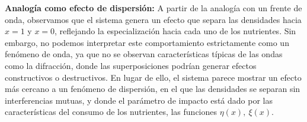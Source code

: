 \textbf{Analogía como efecto de dispersión:}
A partir de la analogía con un frente de onda, observamos que el sistema genera un efecto que separa las densidades hacia $x=1$ y $x=0$, reflejando la especialización hacia cada uno de los nutrientes. Sin embargo, no podemos interpretar este comportamiento estrictamente como un fenómeno de onda, ya que no se observan características típicas de las ondas como la difracción, donde las superposiciones podrían generar efectos constructivos o destructivos. En lugar de ello, el sistema parece mostrar un efecto más cercano a un fenómeno de dispersión, en el que las densidades se separan sin interferencias mutuas, y donde el parámetro de impacto está dado por las características del consumo de los nutrientes, las funciones $\eta(x),\:\xi(x)$.